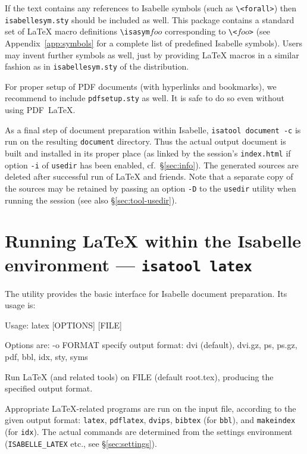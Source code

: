 If the text contains any references to Isabelle symbols (such as
\verb,\<forall>,) then \texttt{isabellesym.sty} should be included as well.
This package contains a standard set of {\LaTeX} macro definitions
\verb,\isasym,$foo$ corresponding to \verb,\<,$foo$\verb,>, (see
Appendix~\ref{app:symbols} for a complete list of predefined Isabelle
symbols).  Users may invent further symbols as well, just by providing
{\LaTeX} macros in a similar fashion as in \texttt{isabellesym.sty} of the
distribution.

For proper setup of PDF documents (with hyperlinks and bookmarks), we
recommend to include \verb,pdfsetup.sty, as well.  It is safe to do so
even without using PDF~\LaTeX.

\medskip As a final step of document preparation within Isabelle,
\texttt{isatool document -c} is run on the resulting \texttt{document}
directory.  Thus the actual output document is built and installed in its
proper place (as linked by the session's \texttt{index.html} if option
\texttt{-i} of \texttt{usedir} has been enabled, cf.\ \S\ref{sec:info}).  The
generated sources are deleted after successful run of {\LaTeX} and friends.
Note that a separate copy of the sources may be retained by passing an option
\texttt{-D} to the \texttt{usedir} utility when running the session (see also
\S\ref{sec:tool-usedir}).


\section{Running {\LaTeX} within the Isabelle environment --- \texttt{isatool latex}}
\label{sec:tool-latex}

The  utility provides the basic interface for Isabelle document
preparation.  Its usage is:
\begin{ttbox}
Usage: latex [OPTIONS] [FILE]

  Options are:
    -o FORMAT    specify output format: dvi (default), dvi.gz, ps,
                 ps.gz, pdf, bbl, idx, sty, syms

  Run LaTeX (and related tools) on FILE (default root.tex),
  producing the specified output format.
\end{ttbox}
Appropriate {\LaTeX}-related programs are run on the input file,
according to the given output format: \texttt{latex},
\texttt{pdflatex}, \texttt{dvips}, \texttt{bibtex} (for \texttt{bbl}),
and \texttt{makeindex} (for \texttt{idx}).  The actual commands are
determined from the settings environment (\texttt{ISABELLE_LATEX}
etc., see \S\ref{sec:settings}).

